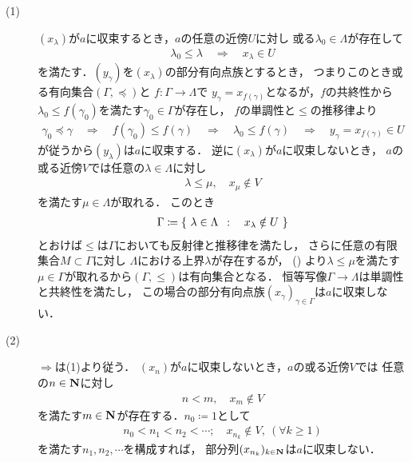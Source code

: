 	\begin{prf}\mbox{}
		\begin{description}
			\item[(1)]
				$(x_\lambda)$が$a$に収束するとき，$a$の任意の近傍$U$に対し
				或る$\lambda_0 \in \Lambda$が存在して
				\begin{align}
					\lambda_0 \leq \lambda
					\quad \Longrightarrow \quad
					x_\lambda \in U
				\end{align}
				を満たす．$(y_\gamma)$を$(x_\lambda)$の部分有向点族とするとき，
				つまりこのとき或る有向集合$(\Gamma,\preceq)$と
				$f:\Gamma \longrightarrow \Lambda$で
				$y_\gamma = x_{f(\gamma)}$となるが，$f$の共終性から
				$\lambda_0 \leq f(\gamma_0)$を満たす$\gamma_0 \in \Gamma$が存在し，
				$f$の単調性と$\leq$の推移律より
				\begin{align}
					\gamma_0 \preceq \gamma
					\quad \Longrightarrow \quad
					f(\gamma_0) \leq f(\gamma)
					\quad \Longrightarrow \quad
					\lambda_0 \leq f(\gamma)
					\quad \Longrightarrow \quad
					y_\gamma = x_{f(\gamma)} \in U
				\end{align}
				が従うから$(y_\lambda)$は$a$に収束する．
				逆に$(x_\lambda)$が$a$に収束しないとき，
				$a$の或る近傍$V$では任意の$\lambda \in \Lambda$に対し
				\begin{align}
					\lambda \leq \mu,
					\quad x_\mu \notin V
					\label{eq:thm_a_net_converges_iff_every_subnet_converges_1}
				\end{align}
				を満たす$\mu \in \Lambda$が取れる．
				このとき
				\begin{align}
					\Gamma \coloneqq \left\{\ \lambda \in \Lambda\ \, : \quad x_\lambda \notin U\ \right\}
				\end{align}
				とおけば$\leq$は$\Gamma$においても反射律と推移律を満たし，
				さらに任意の有限集合$M \subset \Gamma$に対し
				$\Lambda$における上界$\lambda$が存在するが，
				()
				より$\lambda \leq \mu$を満たす
				$\mu \in \Gamma$が取れるから$(\Gamma,\leq)$は有向集合となる．
				恒等写像$\Gamma \longrightarrow \Lambda$は単調性と共終性を満たし，
				この場合の部分有向点族$(x_\gamma)_{\gamma \in \Gamma}$は$a$に収束しない．
			
			\item[(2)]
				$\Longrightarrow$は(1)より従う．
				$(x_n)$が$a$に収束しないとき，$a$の或る近傍$V$では
				任意の$n \in \mathbf{N}$に対し
				\begin{align}
					n < m,\quad x_m \notin V
				\end{align}
				を満たす$m \in \mathbf{N}$が存在する．$n_0 \coloneqq 1$として
				\begin{align}
					n_0 < n_1 < n_2 < \cdots;
					\quad x_{n_k} \notin V,\ (\forall k \geq 1)
				\end{align}
				を満たす$n_1,n_2,\cdots$を構成すれば，
				部分列$(x_{n_k})_{k \in \mathbf{N}}$は$a$に収束しない．
				\QED
		\end{description}
	\end{prf}
	
